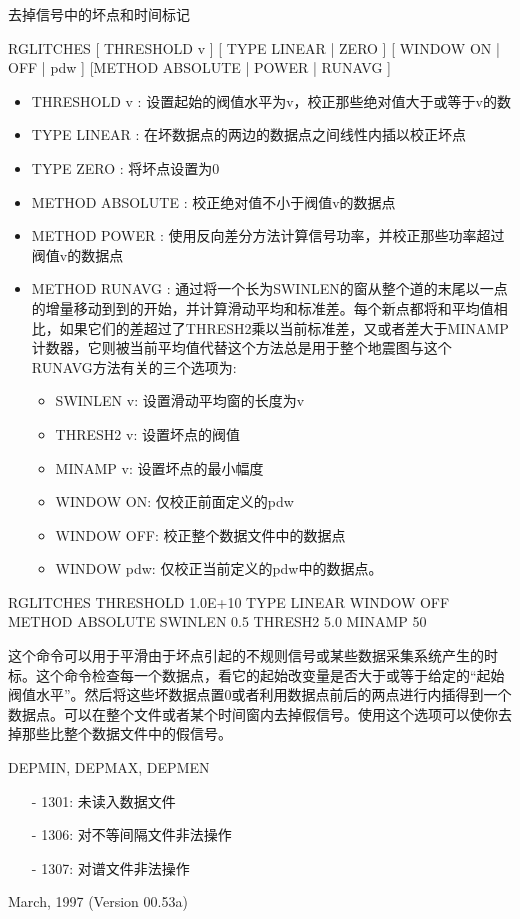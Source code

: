 \label{cmd:rglitches}

去掉信号中的坏点和时间标记

RGLITCHES [ THRESHOLD v ] [ TYPE LINEAR | ZERO ] [ WINDOW ON | OFF | pdw ] [METHOD ABSOLUTE | POWER | RUNAVG ]

\begin{itemize}
\item THRESHOLD v : 设置起始的阀值水平为v，校正那些绝对值大于或等于v的数
\item TYPE LINEAR : 在坏数据点的两边的数据点之间线性内插以校正坏点 
\item TYPE ZERO : 将坏点设置为0 
\item METHOD ABSOLUTE : 校正绝对值不小于阀值v的数据点 
\item METHOD POWER : 使用反向差分方法计算信号功率，并校正那些功率超过阀值v的数据点 
\item METHOD RUNAVG : 通过将一个长为SWINLEN的窗从整个道的末尾以一点的增量移动到到的开始，并计算滑动平均和标准差。每个新点都将和平均值相比，如果它们的差超过了THRESH2乘以当前标准差，又或者差大于MINAMP计数器，它则被当前平均值代替这个方法总是用于整个地震图与这个RUNAVG方法有关的三个选项为:
	\begin{itemize}
	\item SWINLEN v: 设置滑动平均窗的长度为v
	\item THRESH2 v: 设置坏点的阀值
	\item MINAMP  v: 设置坏点的最小幅度
	\item WINDOW ON: 仅校正前面定义的pdw
	\item WINDOW OFF: 校正整个数据文件中的数据点
	\item WINDOW pdw: 仅校正当前定义的pdw中的数据点。
	\end{itemize} 
\end{itemize}

RGLITCHES THRESHOLD 1.0E+10 TYPE LINEAR WINDOW OFF METHOD ABSOLUTE SWINLEN 0.5 THRESH2 5.0 MINAMP 50

这个命令可以用于平滑由于坏点引起的不规则信号或某些数据采集系统产生的时标。这个命令检查每一个数据点，看它的起始改变量是否大于或等于给定的“起始阀值水平”。然后将这些坏数据点置0或者利用数据点前后的两点进行内插得到一个数据点。可以在整个文件或者某个时间窗内去掉假信号。使用这个选项可以使你去掉那些比整个数据文件中的假信号。

DEPMIN, DEPMAX, DEPMEN

\begin{itemize}
\item[-]1301: 未读入数据文件
\item[-]1306: 对不等间隔文件非法操作
\item[-]1307: 对谱文件非法操作
\end{itemize}

March, 1997 (Version 00.53a)
